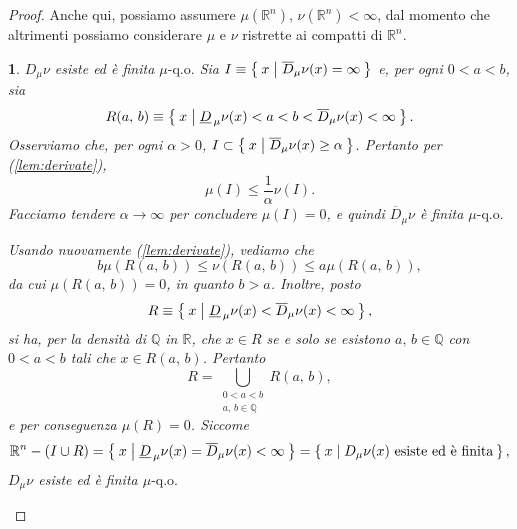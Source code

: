 \documentclass[a4paper,10pt,openright,oneside]{book}
\theoremstyle{theoremstyle}
\theoremstyle{theoremstylewoheader}
\theoremstyle{theoremstyle}
\theoremstyle{proofsecstyle}
\newtheorem{proofsec}{}
\theoremstyle{nonumberplain}
\newtheorem{proof}{Dim.}
\newcommand{\QQ}{\ensuremath{\mathbb{Q}}}
\newcommand{\RR}{\ensuremath{\mathbb{R}}}
\newcommand{\lDer}[2]{\ensuremath{\underline{D}_{\,#2} #1}}
\newcommand{\uDer}[2]{\ensuremath{\overline{D}_#2 #1}}
\newcommand{\Der}[2]{\ensuremath{D_#2 #1}}
\newcommand{\qo}[1]{\ensuremath{#1\text{-q.o.}}}
\begin{document}
\begin{proof}
Anche qui, possiamo assumere $\mu(\RR^n),\, \nu(\RR^n) < \infty$, dal momento che altrimenti possiamo considerare $\mu$ e $\nu$ ristrette ai compatti di $\RR^n$.

\begin{proofsec}
\emph{$\Der{\nu}{\mu}$ esiste ed è finita $\qo{\mu}$}\hspace{.5em} Sia $I \equiv \Set{ x | \uDer{\nu}{\mu} (x) = \infty }$ e, per ogni $0 < a < b$, sia
\[
R(a,\, b) \equiv \Set{ x | \lDer{\nu}{\mu} (x) < a < b < \uDer{\nu}{\mu} (x) < \infty }.
\]
Osserviamo che, per ogni $\alpha > 0$, $I \subset \Set{ x | \uDer{\nu}{\mu} (x) \ge \alpha }$. Pertanto per (\ref{lem:derivate}),
\[
\mu(I) \le \frac{1}{\alpha} \nu(I).
\]
Facciamo tendere $\alpha \to \infty$ per concludere $\mu(I) = 0$, e quindi $\uDer{\nu}{\mu}$ è finita $\qo{\mu}$

Usando nuovamente (\ref{lem:derivate}), vediamo che
\[
b \mu(R(a,\, b)) \le \nu(R(a,\, b)) \le a\mu(R(a,\, b)),
\]
da cui $\mu(R(a,\, b)) = 0$, in quanto $b > a$. Inoltre, posto
\[
R \equiv \Set{ x | \lDer{\nu}{\mu} (x) < \uDer{\nu}{\mu} (x) < \infty },
\]
si ha, per la densità di $\QQ$ in $\RR$, che $x \in R$ se e solo se esistono $a,\, b \in \QQ$ con $0 < a < b$ tali che $x \in R(a,\, b)$. Pertanto
\[
R = \bigcup_{\substack{0 < a < b\\a,\, b \in \QQ}} R(a,\, b),
\]
e per conseguenza $\mu(R) = 0$. Siccome
\[
\RR^n - (I \cup R) = \Set{ x | \lDer{\nu}{\mu} (x) = \uDer{\nu}{\mu} (x) < \infty } = \Set{ x | \Der{\nu}{\mu} (x) \text{ esiste ed è finita} },
\]
$\Der{\nu}{\mu}$ esiste ed è finita $\qo{\mu}$
\end{proofsec}


\end{proof}
\end{document}
